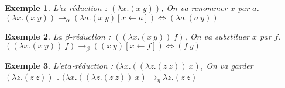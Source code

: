 \documentclass[10pt,a4paper]{report}
\newtheorem{ex}{Exemple}
\begin{document}
	\begin{ex} 
		L'$\alpha$-réduction : $(\lambda x.(x~y)) $, On va renommer $x$ par $a$. $(\lambda x.(x~y)) \rightarrow_{\alpha} (\lambda a.(x~y)[x \leftarrow a]) \Longleftrightarrow (\lambda a.(a~y))$ 	
	\end{ex}
	
	\begin{ex}
		La $\beta$-réduction : $((\lambda x.(x~y))~f)$, On va substituer $x$ par $f$. $((\lambda x.(x~y))~f) \rightarrow_{\beta} ((x~y)[x \leftarrow f]) \Longleftrightarrow (f~y)$ 
	\end{ex}
	
	\begin{ex}
		L'$eta$-réduction : $(\lambda x.((\lambda z.(z~z))~x)$, On va garder $(\lambda z.(z~z))$ . $(\lambda x.((\lambda z.(z~z))~x) \rightarrow_{\eta} \lambda z.(z~z)$ 
	\end{ex}
	
\end{document}
